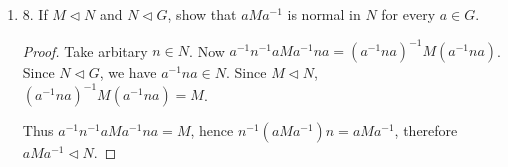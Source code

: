 \begin{enumerate}[resume]
\begin{proof}
	We have arrived at a contradiction, so the center of $A_n$ must be $(e)$.
\end{proof}
\begin{correction}
	The red part is incorrect since $(a,b) \not\in A_n$ (it is in fact in $S_n$ ), and $\sigma$ only commutes with elements in $A_n$.


	Take $a,b,c,d$ such that $\sigma(a) = b$ and $\sigma(c) = d$. Now $(b,a,c) \sigma (a) = a$ but $\sigma(b,a,c)(a) = d$, a contradiction.
\end{correction}

	\item 8. If $M \triangleleft N$ and $N \triangleleft G$, show that $a M a^{-1}$ is normal in $N$ for every $a \in G$.
\begin{proof}
	Take arbitary $n \in N$. Now $a^{-1} n^{-1} a M a^{-1}  n a = (a^{-1} n a)^{-1} M (a^{-1} n a)$. Since $N \triangleleft G$, we have $a^{-1} n a \in N$. Since $M \triangleleft N$, $(a^{-1} n a)^{-1} M (a^{-1} n a) = M$.

	Thus $a^{-1} n^{-1} a M a^{-1}  n a  = M$, hence $n^{-1} (a M a^{-1}) n = a M a^{-1} $, therefore $a M a^{-1}  \triangleleft N$.
\end{proof}

\end{enumerate}
